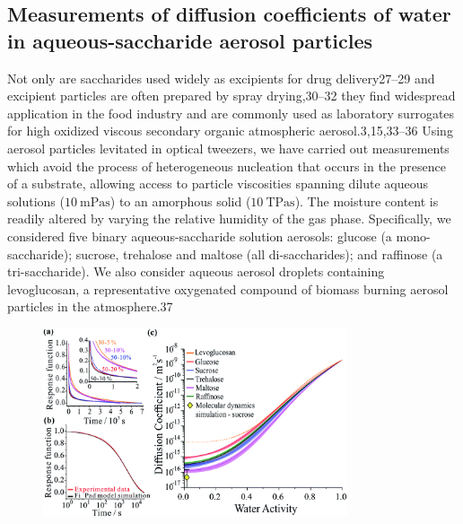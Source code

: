 \subsection{Measurements of diffusion coefficients of water in aqueous-saccharide aerosol particles}

Not only are saccharides used widely as excipients for drug delivery27–29 and excipient particles are often prepared by spray drying,30–32 they find widespread application in the food industry and are commonly used as laboratory surrogates for high oxidized viscous secondary organic atmospheric aerosol.3,15,33–36 Using aerosol particles levitated in optical tweezers, we have carried out measurements which avoid the process of heterogeneous nucleation that occurs in the presence of a substrate, allowing access to particle viscosities spanning dilute aqueous solutions ($\SI{10}{\milli\pascal\second}$) to an amorphous solid ($\SI{10}{\tera\pascal\second}$). The moisture content is readily altered by varying the relative humidity of the gas phase. Specifically, we considered five binary aqueous-saccharide solution aerosols: glucose (a mono-saccharide); sucrose, trehalose and maltose (all di-saccharides); and raffinose (a tri-saccharide). We also consider aqueous aerosol droplets containing levoglucosan, a representative oxygenated compound of biomass burning aerosol particles in the atmosphere.37

\begin{figure}
    \centering
    \includegraphics[width=0.8\textwidth]{chapters/water_hopping/figures/f1.png}
    \label{fig:wat_workflow}
\end{figure}

